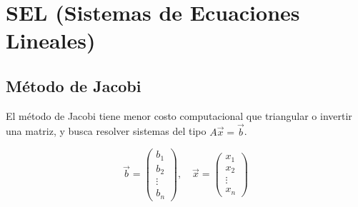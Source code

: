 \section{SEL (Sistemas de Ecuaciones Lineales)}

\subsection{Método de Jacobi}
El método de Jacobi tiene menor costo computacional que triangular o invertir una matriz, y busca resolver sistemas del tipo $A\vec{x}=\vec{b}$.

$$\vec{b}=\begin{pmatrix} b_1 \\ b_2 \\ \vdots \\ b_n \end{pmatrix}, \quad \vec{x}=\begin{pmatrix} x_1 \\ x_2 \\ \vdots \\ x_n \end{pmatrix}$$

